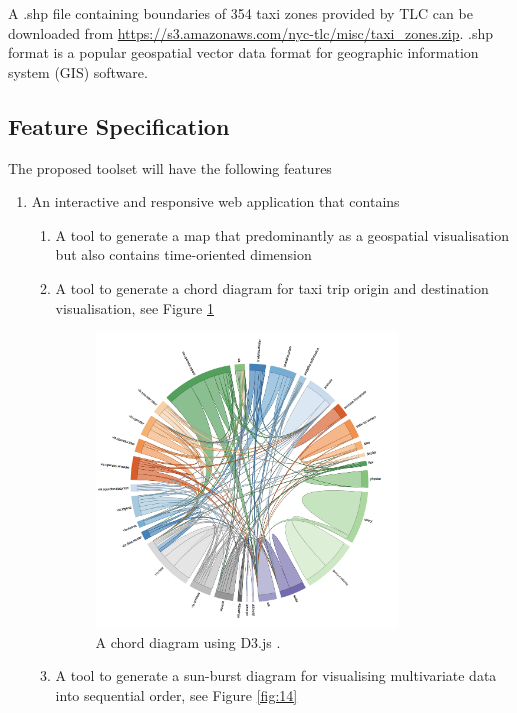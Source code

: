 \documentclass[11pt,a4paper]{article}
\begin{document}
A .shp file containing boundaries of 354 taxi zones provided by TLC can be downloaded from \url{https://s3.amazonaws.com/nyc-tlc/misc/taxi_zones.zip}. .shp format is a popular geospatial vector data format for geographic information system (GIS) software.

\subsection{Feature Specification}
The proposed toolset will have the following features
\begin{enumerate}
	\item An interactive and responsive web application that contains
	      \begin{enumerate}
	      	\item A tool to generate a map that predominantly as a geospatial visualisation but also contains time-oriented dimension
	      	\item A tool to generate a chord diagram for taxi trip origin and destination visualisation, see Figure \ref{fig:13}
	      	      
	      	      \begin{figure}[H]
	      	      	\centering
	      	      	\includegraphics[width=8cm,keepaspectratio]{figures/fig13.png}
	      	      	\caption{\label{fig:13}A chord diagram using D3.js \parencite{Bostock2017}.}
	      	      \end{figure}
	      	      	
	      	\item A tool to generate a sun-burst diagram for visualising multivariate data into sequential order, see Figure \ref{fig:14}
	      	      

\end{enumerate}
\end{enumerate}
\end{document}
